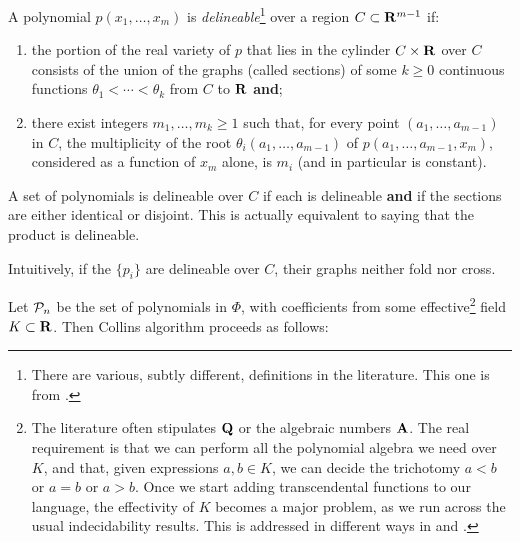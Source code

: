 \documentclass[runningheads,a4paper]{llncs}
\begin{document}
\begin{definition}\label{def:del}
A polynomial $p(x_1,\ldots,x_m)$ is \emph{delineable}\footnote{There are various, subtly different, definitions in the literature. This one is from \cite{McCallum1999a}.} over a region $C\subset{\mathbf R}^{m-1}$ if:
\begin{enumerate}
\item the portion of the real variety of $p$ that lies in the cylinder $C\times{\mathbf R}$ over $C$ consists of the union of the graphs (called sections) of some $k\ge0$ continuous functions $\theta_1<\cdots<\theta_k$ from $C$ to ${\mathbf R}$ {\bf and};
\item there exist integers $m_1,\ldots, m_k \ge 1$ such that, for every point $(a_1,\ldots, a_{m-1})$ in $C$, the multiplicity of the root $\theta_i(a_1,\ldots, a_{m-1})$ of $p(a_1,\ldots, a_{m-1},x_m)$, considered as a function of $x_m$ alone, is $m_i$ (and in particular is constant).
\end{enumerate}
A set of polynomials is delineable over $C$ if each is delineable {\bf and} if the sections are either identical or disjoint. This is actually equivalent to saying that the product is delineable.
\end{definition}
Intuitively, if the $\{p_i\}$ are delineable over $C$, their graphs neither fold nor cross.
\par
Let ${\cal P}_n$ be the set of polynomials in $\Phi$, with coefficients from some effective\footnote{The literature often stipulates ${\mathbf Q}$ or the algebraic numbers ${\mathbf A}$. The real requirement is that we can perform all the polynomial algebra we need over $K$, and that, given expressions $a,b\in K$, we can decide the trichotomy $a<b$ or $a=b$ or $a>b$. Once we start adding transcendental functions to our language, the effectivity of $K$ becomes a major problem, as we run across the usual indecidability results. This is addressed in different ways in \cite{Achatzetal2008} and \cite{Vorobjov1989,Vorobjov1992}.} field $K\subset{\mathbf R}$.  Then Collins algorithm proceeds as follows:
\end{document}
